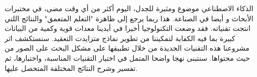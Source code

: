 \begin{RLtext}
الذكاء الاصطناعي موضوع ومثيرة للجدل، اليوم أكثر من أي وقت مضى، في مختبرات الأبحاث و أيضا في الصناعة. هذا ربما يرجع إلى ظاهرة "التعلم المتعمق" والنتائج  اللتي انتجت تقنياته. فقد وضعت التكنولوجيا أخيرا في أيدينا معدات قوية وكمية من البيانات كبيرة بما فيه الكفاية لتمكيننا من تطوير نماذج متزايدت التعقيد. سنستكشف اثر مشروعنا هذه التقنيات الجديدة من خلال تطبيقها على مشكل البحث على الصور من حيث محتواها.
 سنتبنى نهجا واضحا المتمل في اختيار التقنيات المناسبة، واختبارها، ثم تفسير وشرح النتائج المختلفة المتحصل عليها.
\end{RLtext}